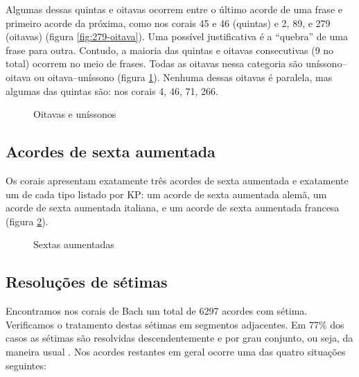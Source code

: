 Algumas dessas quintas e oitavas ocorrem entre o último acorde de uma
frase e primeiro acorde da próxima, como nos corais 45 e 46 (quintas)
e 2, 89, e 279 (oitavas) (figura \ref{fig:279-oitava}). Uma possível
justificativa é a ``quebra'' de uma frase para outra. Contudo, a
maioria das quintas e oitavas consecutivas (9 no total) ocorrem no
meio de frases. Todas as oitavas nessa categoria são uníssono--oitava
ou oitava--uníssono (figura \ref{fig:oitavas-e-unissonos}). Nenhuma
dessas oitavas é paralela, mas algumas das quintas são: nos corais 4,
46, 71, 266.

\begin{figure}
  \centering
  \qquad
  \qquad
  \caption{Oitavas e uníssonos}
  \label{fig:oitavas-e-unissonos}
\end{figure}

\subsection{Acordes de sexta aumentada}
\label{sec:acordes-de-sexta}

Os corais apresentam exatamente três acordes de sexta aumentada e
exatamente um de cada tipo listado por KP: um acorde de sexta
aumentada alemã, um acorde de sexta aumentada italiana, e um acorde de
sexta aumentada francesa (figura \ref{fig:sextas-aumentadas}).

\begin{figure}
  \centering
  \caption{Sextas aumentadas}
  \label{fig:sextas-aumentadas}
\end{figure}

\subsection{Resoluções de sétimas}
\label{sec:setimas}

Encontramos nos corais de Bach um total de 6297 acordes com sétima.
Verificamos o tratamento destas sétimas em segmentos adjacentes. Em
77\% dos casos as sétimas são resolvidas descendentemente e por grau
conjunto, ou seja, da maneira usual \cite[p. 207]{kostka.ea00:tonal}.
Nos acordes restantes em geral ocorre uma das quatro situações
seguintes:


